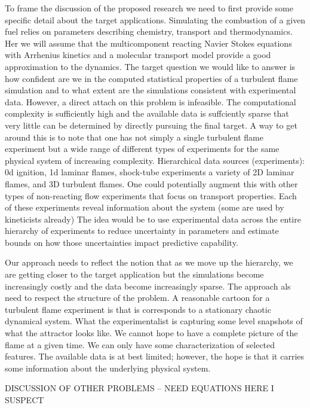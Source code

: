 \documentclass[11pt]{article}
\newcommand{\MarginPar}[1]{\marginpar{%
\vskip-\baselineskip %
\raggedright\tiny\sffamily
\hrule\smallskip{\color{red}#1}\par\smallskip\hrule}}
\begin{document}
To frame the discussion of the proposed research we need to first provide some specific detail
about the target applications.
Simulating the combustion of a given fuel relies on parameters
describing chemistry, transport and thermodynamics.
Her we will assume that the multicomponent reacting Navier Stokes equations with Arrhenius
kinetics and a molecular transport model provide a good approximation to the dynamics.
The target question we would like to answer is how confident are we in the computed statistical
properties of a turbulent flame simulation and to what extent are the simulations consistent
with experimental data.
However, a direct attach on this problem is infeasible.
The computational complexity is sufficiently high and the available data is suffciently
sparse that very little can be determined by directly pursuing the final target.
A way to get around this is to note that one has not simply a single turbulent flame
experiment but a wide range of different types of experiments for the same physical
system of increasing complexity.  
\MarginPar{something about the type of data somewhere in here}
Hierarchical data sources (experiments): 0d ignition, 1d laminar flames, shock-tube experiments
a variety of 2D laminar flames, and 3D turbulent flames.
One could potentially augment this with other types of non-reacting flow experiments that focus
on transport properties. 
Each of these experiments reveal information about the system (some are used by kineticists already)
The idea would be to use experimental data across the entire hierarchy of experiments to reduce
uncertainty in parameters and estimate bounds on how those uncertainties impact predictive capability.

Our approach needs to reflect the notion that as we move up the hierarchy, we are
getting closer to the target application but the simulations become
increasingly costly and the data become increasingly sparse.
The approach als need to  respect the structure of the problem.
A reasonable cartoon for a 
turbulent flame experiment is that is corresponds to a stationary chaotic dynamical system.
What the experimentalist is capturing some level snapshots of what the attractor looks like.
We cannot hope to have a complete picture of the flame at a given time.  We can only
have some characterization of selected features.  The available data is at best limited;
however, the hope is that it carries some information about the underlying physical system.

DISCUSSION OF OTHER PROBLEMS -- NEED EQUATIONS HERE I SUSPECT
\end{document}
